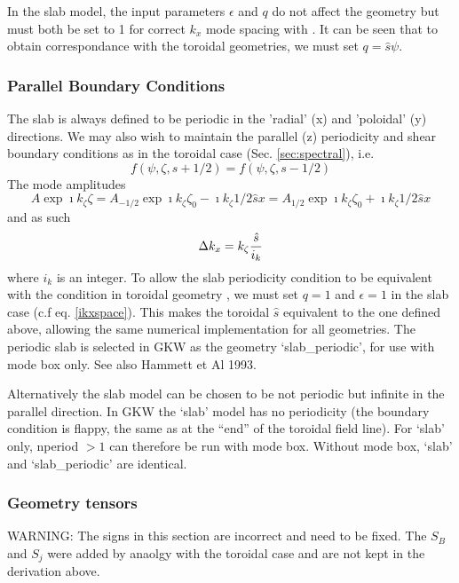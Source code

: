 In the slab model, the input parameters $\epsilon$ and $q$ do not affect the geometry
but must both be set to 1 for correct $k_x$ mode spacing with .
It can be seen that to obtain correspondance with the toroidal geometries, 
we must set $q=\hat{s} \psi$.  


\subsubsection{Parallel Boundary Conditions}

The slab is always defined to be periodic in the 'radial' (x) and 'poloidal' (y) directions.
We may also wish to maintain the parallel (z) periodicity and shear boundary conditions as in the toroidal
case (Sec. \ref{sec:spectral}), i.e.
\begin{equation}
f(\psi,\zeta,s+1/2) = f(\psi,\zeta,s-1/2)
\end{equation}
The mode amplitudes
\begin{equation}
A\exp{\imath k_\zeta \zeta} = A_{-1/2} \exp{\imath k_{\zeta}\zeta_{0} - \imath k_\zeta 1/2\hat{s}x} = A_{1/2} \exp{\imath k_{\zeta}\zeta_{0} + \imath k_\zeta 1/2\hat{s}x}
\end{equation}
and as such
\begin{equation}
\Delta k_x = k_{\zeta} {\hat{s} \over i_k}
\end{equation}
where $i_k$ is an integer.  To allow the slab periodicity condition to be equivalent with the condition in toroidal geometry , we must set $q=1$ and $\epsilon=1$ in the slab case (c.f  eq. \ref{ikxspace}).   This makes the toroidal $\hat{s}$ equivalent to the one defined above,
allowing the same numerical implementation for all geometries.  The periodic slab is selected in GKW as the geometry `slab_periodic', for use with mode box only.  See also Hammett et Al 1993.

Alternatively the slab model can be chosen to be not periodic but infinite in the parallel direction. In GKW 
the `slab' model has no periodicity (the boundary condition is flappy, the same as at the ``end'' of the toroidal field line).   
For `slab' only,  nperiod $> 1$ can therefore be run with mode box.  Without mode box, `slab' and `slab_periodic' are identical.


\subsubsection{Geometry tensors}

WARNING:  The signs in this section are incorrect and need to be fixed.
The $S_B$ and $S_j$ were added by anaolgy with the toroidal case and are not kept in the derivation above.

